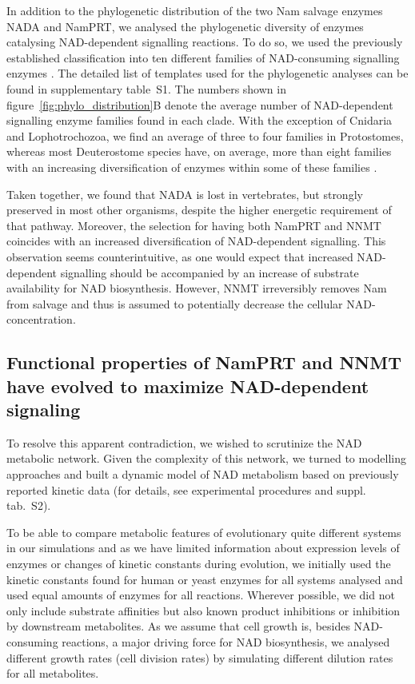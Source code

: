 In addition to the phylogenetic distribution of the two Nam salvage enzymes NADA and NamPRT, we analysed the phylogenetic diversity of enzymes catalysing NAD-dependent signalling reactions. To do so, we used the previously established classification into ten different families of NAD-consuming signalling enzymes \cite{Gossmann2012FEBS}. The detailed list of templates used for the phylogenetic analyses can be found in supplementary table~S1. The numbers shown in figure~\ref{fig:phylo_distribution}B denote the average number of NAD-dependent signalling enzyme families found in each clade. With the exception of Cnidaria and Lophotrochozoa, we find an average of three to four families in Protostomes, whereas most Deuterostome species have, on average, more than eight families with an increasing diversification of enzymes within some of these families \cite{Gossmann2014DNAR}.

Taken together, we found that NADA is lost in vertebrates, but strongly preserved in most other organisms, despite the higher energetic requirement of that pathway. Moreover, the selection for having both NamPRT and NNMT coincides with an increased diversification of NAD-dependent signalling. This observation seems counterintuitive, as one would expect that increased NAD-dependent signalling should be accompanied by an increase of substrate availability for NAD biosynthesis. However, NNMT irreversibly removes Nam from salvage and thus is assumed to potentially decrease the cellular NAD-concentration.


\subsection{Functional properties of NamPRT and NNMT have evolved to maximize NAD-dependent signaling}

To resolve this apparent contradiction, we wished to scrutinize the NAD metabolic network. Given the complexity of this network, we turned to modelling approaches and built a dynamic model of NAD metabolism based on previously reported kinetic data (for details, see experimental procedures and suppl. tab.~S2).

To be able to compare metabolic features of evolutionary quite different systems in our simulations and as we have limited information about expression levels of enzymes or changes of kinetic constants during evolution, we initially used the kinetic constants found for human or yeast enzymes for all systems analysed and used equal amounts of enzymes for all reactions. Wherever possible, we did not only include substrate affinities but also known product inhibitions or inhibition by downstream metabolites. As we assume that cell growth is, besides NAD-consuming reactions, a major driving force for NAD biosynthesis, we analysed different growth rates (cell division rates) by simulating different dilution rates for all metabolites.

